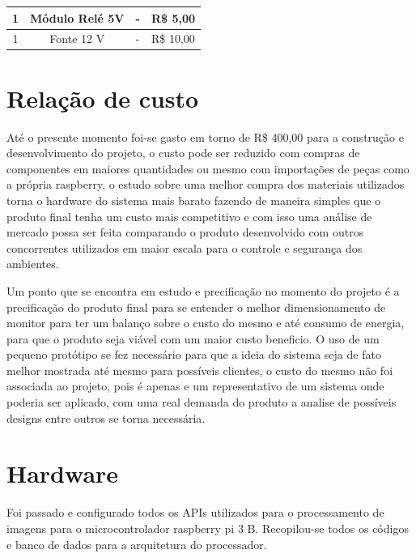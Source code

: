 \documentclass[conference,compsoc]{IEEEtran}
\begin{document}
\begin{table}[!ht]
\begin{tabular}{|c|c|c|c|}
{\color[HTML]{000000} 1}            & {\color[HTML]{000000} Módulo Relé 5V}                                                                & {\color[HTML]{000000} -}                   & {\color[HTML]{000000} R\$ 5,00}       \\ \hline
{\color[HTML]{000000} 1}            & {\color[HTML]{000000} Fonte 12 V}                                                                    & {\color[HTML]{000000} -}                   & {\color[HTML]{000000} R\$ 10,00}      \\ \hline
\end{tabular}
\end{table}

 \section{Relação de custo}
 Até o presente momento foi-se gasto em torno de R\$ 400,00 para a construção e desenvolvimento do projeto, o custo pode ser reduzido com compras de componentes em maiores quantidades ou mesmo com importações de peças como a própria raspberry, o estudo sobre uma melhor compra dos materiais utilizados torna o hardware do sistema mais barato fazendo de maneira simples que o produto final tenha um custo mais competitivo e com isso uma análise de mercado possa ser feita comparando o produto desenvolvido com outros concorrentes utilizados em maior escala para o controle e segurança dos ambientes.
 
Um ponto que se encontra em estudo e precificação no momento do projeto é a precificação do produto final para se entender o melhor dimensionamento de monitor para ter um balanço sobre o custo do mesmo e até consumo de energia, para que o produto seja viável com um maior custo beneficio. O uso de um pequeno protótipo se fez necessário para que a ideia do sistema seja de fato melhor mostrada até mesmo para possíveis clientes, o custo do mesmo não foi associada ao projeto, pois é apenas e um representativo de um sistema onde poderia ser aplicado, com uma real demanda do produto a analise de possíveis designs entre outros se torna necessária.

 \section{Hardware}
 
 Foi passado e configurado todos os APIs utilizados para o processamento de imagens para o microcontrolador raspberry pi 3 B. Recopilou-se todos os códigos e banco de dados para a arquitetura do processador. 
 
\end{document}
